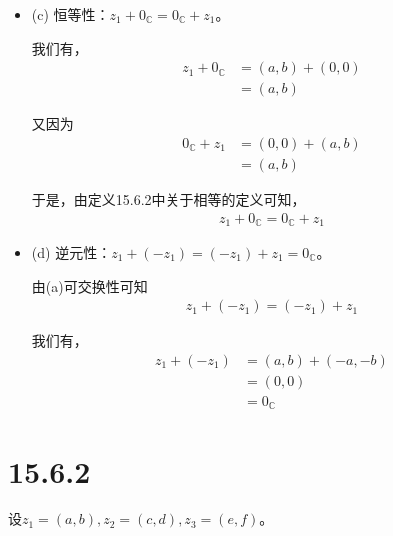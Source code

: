 \documentclass{article}
\begin{document}
\begin{itemize}
  \item (c) 恒等性：$z_1 + 0_\mathbb{C} = 0_\mathbb{C} + z_1$。

        我们有，
        \begin{align*}
          z_1 + 0_\mathbb{C} & = (a, b) + (0, 0) \\
                             & = (a, b)
        \end{align*}

        又因为
        \begin{align*}
          0_\mathbb{C} + z_1 & = (0, 0) + (a, b) \\
                             & = (a, b)
        \end{align*}

        于是，由定义15.6.2中关于相等的定义可知，
        \begin{align*}
          z_1 + 0_\mathbb{C} = 0_\mathbb{C} + z_1
        \end{align*}

  \item (d) 逆元性：$z_1 + (-z_1) = (-z_1) + z_1 = 0_\mathbb{C}$。

        由(a)可交换性可知
        \begin{align*}
          z_1 + (-z_1) = (-z_1) + z_1
        \end{align*}

        我们有，
        \begin{align*}
          z_1 + (-z_1) & = (a, b) + (-a, -b) \\
                       & = (0, 0)            \\
                       & = 0_\mathbb{C}
        \end{align*}

\end{itemize}

\section*{15.6.2}

设$z_1 = (a, b), z_2 = (c, d), z_3 = (e, f)$。
\end{document}
